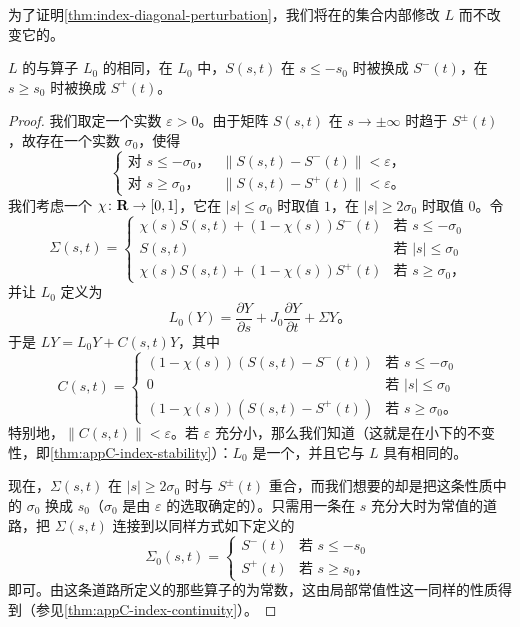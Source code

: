 为了证明\cref{thm:index-diagonal-perturbation}，我们将在\trFredholmOperator{}的集合内部修改 $L$ 而不改变它的\trIndex。

\begin{lemma}\label{thm:index-plateau}
$L$ 的\trIndex{}与算子 $L_0$ 的\trIndex{}相同，在 $L_0$ 中，$S(s,t)$ 在 $s\le-s_0$ 时被换成 $S^{-}(t)$，在 $s\ge s_0$ 时被换成 $S^{+}(t)$。
\end{lemma}

\begin{proof}
我们取定一个实数 $\varepsilon>0$。由于矩阵 $S(s,t)$ 在 $s\to\pm\infty$ 时趋于 $S^{\pm}(t)$，故存在一个实数 $\sigma_0$，使得
\[
\left\{\begin{array}{ll}
\text{对 }s\le-\sigma_0\text{，} & \|S(s,t)-S^{-}(t)\|<\varepsilon\text{，}\\
\text{对 }s\ge\sigma_0\text{，} & \|S(s,t)-S^{+}(t)\|<\varepsilon\text{。}
\end{array}\right.
\]
我们考虑一个\trPlateauFunction{} $\chi\colon\mathbf{R}\to[0,1]$，它在 $|s|\le\sigma_0$ 时取值 $1$，在 $|s|\ge 2\sigma_0$ 时取值 $0$。令
\[
\Sigma(s,t)=\left\{\begin{array}{ll}
\chi(s)S(s,t)+(1-\chi(s))S^{-}(t) & \text{若 }s\le-\sigma_0\\
S(s,t) & \text{若 }|s|\le\sigma_0\\
\chi(s)S(s,t)+(1-\chi(s))S^{+}(t) & \text{若 }s\ge\sigma_0\text{，}
\end{array}\right.
\]
并让 $L_0$ 定义为
\[
L_0(Y)=\frac{\partial Y}{\partial s}+J_0\frac{\partial Y}{\partial t}+\Sigma Y\text{。}
\]
于是 $LY=L_0Y+C(s,t)Y$，其中
\[
C(s,t)=\left\{\begin{array}{ll}
(1-\chi(s))(S(s,t)-S^{-}(t)) & \text{若 }s\le-\sigma_0\\
0 & \text{若 }|s|\le\sigma_0\\
(1-\chi(s))(S(s,t)-S^{+}(t)) & \text{若 }s\ge\sigma_0\text{。}
\end{array}\right.
\]
特别地，$\|C(s,t)\|<\varepsilon$。若 $\varepsilon$ 充分小，那么我们知道（这就是\trIndex{}在小\trPerturbation{}下的不变性，即\cref{thm:appC-index-stability}）：$L_0$ 是一个\trFredholmOperator，并且它与 $L$ 具有相同的\trIndex。

现在，$\Sigma(s,t)$ 在 $|s|\ge 2\sigma_0$ 时与 $S^{\pm}(t)$ 重合，而我们想要的却是把这条性质中的 $\sigma_0$ 换成 $s_0$（$\sigma_0$ 是由 $\varepsilon$ 的选取确定的）。只需用一条在 $s$ 充分大时为常值的道路，把 $\Sigma(s,t)$ 连接到以同样方式如下定义的
\[
\Sigma_0(s,t)=\left\{\begin{array}{ll}
S^{-}(t) & \text{若 }s\le-s_0\\
S^{+}(t) & \text{若 }s\ge s_0\text{，}
\end{array}\right.
\]
即可。由这条道路所定义的那些算子的\trFredholm{}\trIndex{}为常数，这由局部常值性这一同样的性质得到（参见\cref{thm:appC-index-continuity}）。
\end{proof}

